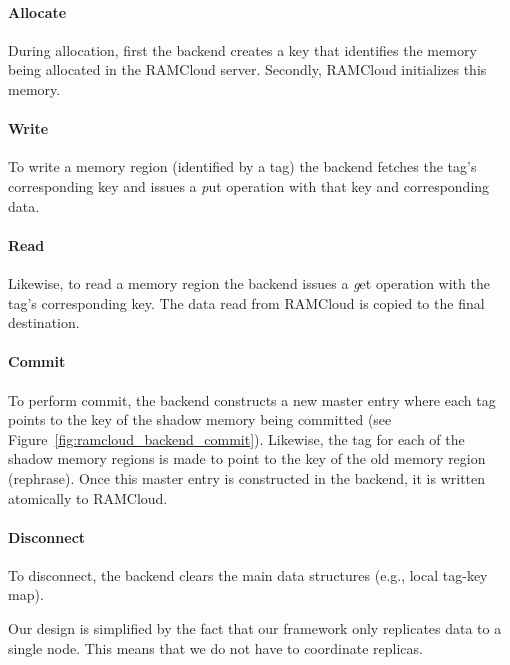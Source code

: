 \paragraph{\bf Allocate} During allocation, first the backend creates a key
that identifies the memory being allocated in the RAMCloud server. Secondly,
RAMCloud initializes this memory.

\paragraph{\bf Write} To write a memory region (identified by a tag) the
backend fetches the tag's corresponding key and issues a {\emph put } operation
with that key and corresponding data.  

\paragraph{\bf Read} Likewise, to read a memory region the backend issues a
{\emph get} operation with the tag's corresponding key. The data read from
RAMCloud is copied to the final destination.  

\paragraph{\bf Commit} To perform commit, the backend constructs a new master
entry where each tag points to the key of the shadow memory being committed
(see Figure~\ref{fig:ramcloud_backend_commit}). Likewise, the tag for each of
the shadow memory regions is made to point to the key of the old memory region
(rephrase). Once this master entry is constructed in the backend, it is written
atomically to RAMCloud.  

\paragraph{\bf Disconnect} To disconnect, the backend clears the main data
structures (e.g., local tag-key map).

Our design is simplified by the fact that our framework only replicates data to
a single node. This means that we do not have to coordinate replicas.
